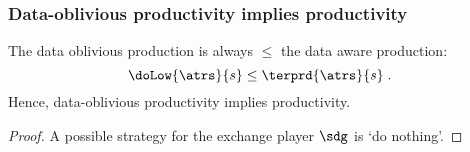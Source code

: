 \documentclass[10pt]{beamer}
\begin{document}
\begin{frame}%
  \frametitle{Data-oblivious productivity implies productivity}

\begin{proposition}
  The data oblivious production is always $\le$ the data aware production:
  \begin{equation*}
    \doLow{\atrs}{s} \le \terprd{\atrs}{s} \; .
  \end{equation*}
  Hence, data-oblivious productivity implies productivity.
\end{proposition}

\begin{proof}
  A possible strategy for the exchange player $\sdg$ is `do nothing'.
\end{proof}

\end{frame}%
\end{document}
